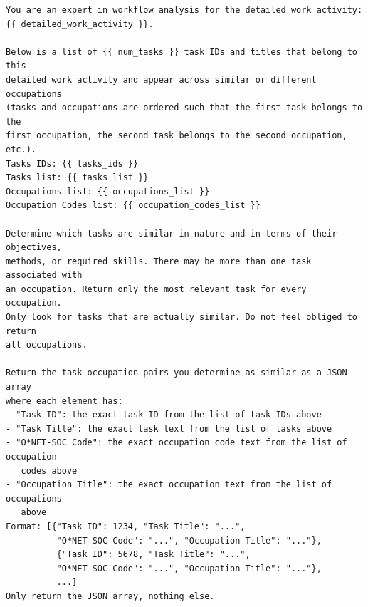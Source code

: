 \newpage
\begin{tcolorbox}[colback=gray!5, colframe=black!60, title={Prompt \#2: GPT-5-mini Prompt for Finding Similar Tasks in Each DWA}]
\begin{verbatim}
You are an expert in workflow analysis for the detailed work activity: 
{{ detailed_work_activity }}.

Below is a list of {{ num_tasks }} task IDs and titles that belong to this 
detailed work activity and appear across similar or different occupations 
(tasks and occupations are ordered such that the first task belongs to the 
first occupation, the second task belongs to the second occupation, etc.).
Tasks IDs: {{ tasks_ids }}
Tasks list: {{ tasks_list }}
Occupations list: {{ occupations_list }}
Occupation Codes list: {{ occupation_codes_list }}

Determine which tasks are similar in nature and in terms of their objectives, 
methods, or required skills. There may be more than one task associated with 
an occupation. Return only the most relevant task for every occupation. 
Only look for tasks that are actually similar. Do not feel obliged to return 
all occupations.

Return the task-occupation pairs you determine as similar as a JSON array 
where each element has:
- "Task ID": the exact task ID from the list of task IDs above
- "Task Title": the exact task text from the list of tasks above
- "O*NET-SOC Code": the exact occupation code text from the list of occupation
   codes above
- "Occupation Title": the exact occupation text from the list of occupations 
   above
Format: [{"Task ID": 1234, "Task Title": "...", 
          "O*NET-SOC Code": "...", "Occupation Title": "..."}, 
          {"Task ID": 5678, "Task Title": "...", 
          "O*NET-SOC Code": "...", "Occupation Title": "..."}, 
          ...]
Only return the JSON array, nothing else.
\end{verbatim}
\end{tcolorbox}


